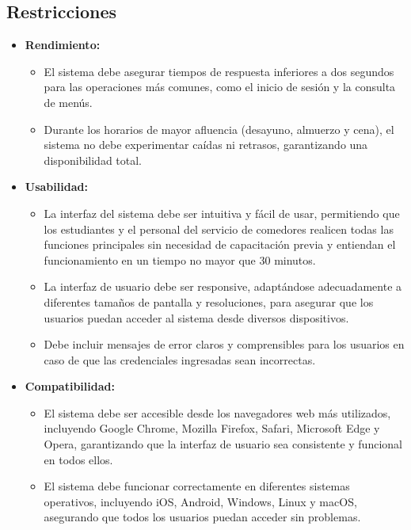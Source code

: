 \documentclass[stu, 12pt, letterpaper, donotrepeattitle, floatsintext, natbib]{apa7}
\begin{document}
\subsection{Restricciones}

\begin{itemize}
	\item \textbf{Rendimiento:}
	\begin{itemize}
		\item El sistema debe asegurar tiempos de respuesta inferiores a dos segundos para las operaciones más comunes, como el inicio de sesión y la consulta de menús.
		
		\item Durante los horarios de mayor afluencia (desayuno, almuerzo y cena), el sistema no debe experimentar caídas ni retrasos, garantizando una disponibilidad total.
	\end{itemize}
	
	\newpage
	\item \textbf{Usabilidad:}
	\begin{itemize}
		\item La interfaz del sistema debe ser intuitiva y fácil de usar, permitiendo que los estudiantes y el personal del servicio de comedores realicen todas las funciones principales sin necesidad de capacitación previa y entiendan el funcionamiento en un tiempo no mayor que 30 minutos.
		
		\item La interfaz de usuario debe ser responsive, adaptándose adecuadamente a diferentes tamaños de pantalla y resoluciones, para asegurar que los usuarios puedan acceder al sistema desde diversos dispositivos.
		
		\item Debe incluir mensajes de error claros y comprensibles para los usuarios en caso de que las credenciales ingresadas sean incorrectas.
	\end{itemize}
	
	\item \textbf{Compatibilidad:}
	\begin{itemize}
		\item El sistema debe ser accesible desde los navegadores web más utilizados, incluyendo Google Chrome, Mozilla Firefox, Safari, Microsoft Edge y Opera, garantizando que la interfaz de usuario sea consistente y funcional en todos ellos.
		
		\item El sistema debe funcionar correctamente en diferentes sistemas operativos, incluyendo iOS, Android, Windows, Linux y macOS, asegurando que todos los usuarios puedan acceder sin problemas.
	\end{itemize}
	

\end{itemize}
\end{document}
